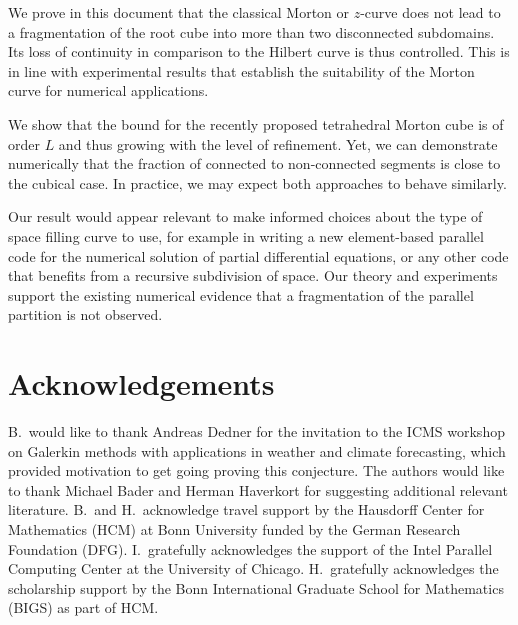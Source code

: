 \documentclass[a4paper,11pt]{article}
\newcommand{\seclab}[1]{\label{sec:#1}}
\begin{document}
We prove in this document that the classical Morton or $z$-curve does not lead
to a fragmentation of the root cube into more than two disconnected subdomains.
Its loss of continuity in comparison to the Hilbert curve is thus controlled.
This is in line with experimental results
that establish the suitability of the Morton curve for
numerical applications.

We show that the bound for the recently proposed tetrahedral Morton cube is of
order $L$ and thus growing with the level of refinement.
Yet, we can demonstrate numerically that the fraction of connected to
non-connected segments is close to the cubical case.
In practice, we may expect both approaches to behave similarly.

Our result would appear relevant to make informed choices about the
type of space filling curve to use, for example in writing a new element-based
parallel code for the numerical solution of partial differential equations, or
any other code that benefits from a recursive subdivision of space.
Our theory and experiments support the existing numerical evidence that a
fragmentation of the parallel partition is not observed.



\section*{Acknowledgements}
\seclab{ack}

B.\  would like to thank Andreas Dedner for the invitation to the ICMS workshop on
Galerkin methods with applications in weather and climate forecasting, which 
provided motivation to get going proving this conjecture.
The authors would like to thank Michael Bader and Herman Haverkort for
suggesting additional relevant literature.
B.\ and H.\ acknowledge travel support by the Hausdorff Center for Mathematics
(HCM) at Bonn University
funded by the German Research Foundation (DFG).
I.\ gratefully acknowledges the support of the Intel Parallel Computing Center
at the University of Chicago.
H.\ gratefully acknowledges the scholarship support by the Bonn International
Graduate School for Mathematics (BIGS) as part of HCM.



\end{document}
